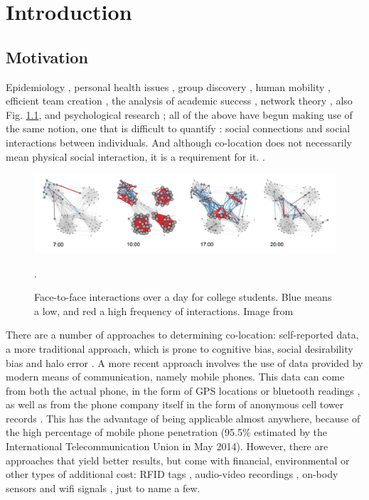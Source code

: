 \chapter{Introduction}

\section{Motivation}

Epidemiology \cite{human_sex}, personal health issues \cite{Madan}, group discovery \cite{5591535}, human mobility \cite{Sun2011929,sevtsuk}, efficient team creation \cite{ECTA, Pentland}, the analysis of academic success \cite{academics}, network theory \cite{networks}, also Fig. \ref{pic:dynamicsf2f}, and psychological research \cite{Rachuri}; all of the above have begun making use of the same notion, one that is difficult to quantify \cite{quant, Wilson}: social connections and social interactions between individuals. And although co-location does not necessarily mean physical social interaction, it is a requirement for it. \cite{Eagle08092009}.

\begin{figure}[h]
	\includegraphics[scale=0.35]{figures/dynamicsf2f.png}
	\caption{Face-to-face interactions over a day for college students. Blue means a low, and red a high frequency of interactions. Image from \protect\cite{Stopczynski}}.
	\label{pic:dynamicsf2f}

\end{figure} 

There are a number of approaches to determining co-location: self-reported data, a more traditional approach, which is prone to cognitive bias, social desirability bias and halo error \cite{Wuchty08092009,gonyea}. A more recent approach involves the use of data provided by modern means of communication, namely mobile phones. This data can come from both the actual phone, in the form of GPS locations or bluetooth readings \cite{Stopczynski}, as well as from the phone company itself in the form of anonymous cell tower records \cite{Onnela01052007, hovel}. This has the advantage of being applicable almost anywhere, because of the high percentage of mobile phone penetration (95.5\% estimated by the International Telecommunication Union in May 2014). 
However, there are approaches that yield better results, but come with financial, environmental or other types of additional cost: RFID tags \cite{catt}, audio-video recordings \cite{audiovideo}, on-body sensors \cite{onbody} and wifi signals \cite{wifi}, just to name a few. 
 
